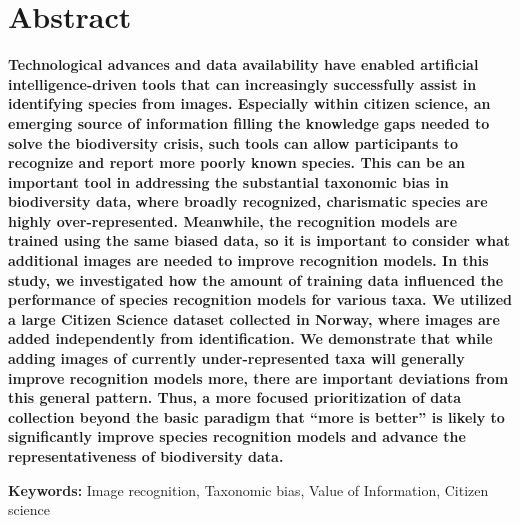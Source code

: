 \documentclass{article}
\begin{document}
\section*{Abstract}
\textbf{Technological advances and data availability have enabled artificial intelligence-driven tools
that can increasingly successfully assist in identifying species from images. Especially within citizen science,
an emerging source of information filling the knowledge gaps needed to solve the biodiversity crisis, such tools 
can allow participants to recognize and report more poorly known species. This can be an important tool in 
addressing the substantial taxonomic bias in biodiversity data, where broadly recognized, charismatic species 
are highly over-represented. Meanwhile, the recognition models are trained using the same biased data, so 
it is important to consider what additional images are needed to improve recognition models. In this study, 
we investigated how the amount of training data influenced the performance of species recognition models for 
various taxa. We utilized a large Citizen Science dataset collected in Norway, where images are added 
independently from identification. We demonstrate that while adding images of currently under-represented 
taxa will generally improve recognition models more, there are important deviations from this general pattern. 
Thus, a more focused prioritization of data collection beyond the basic paradigm that ``more is better'' is 
likely to significantly improve species recognition models and advance the representativeness of biodiversity data.}

\vspace{.5cm}


\noindent\textbf{Keywords:} Image recognition, Taxonomic bias, Value of Information, Citizen science
\end{document}
